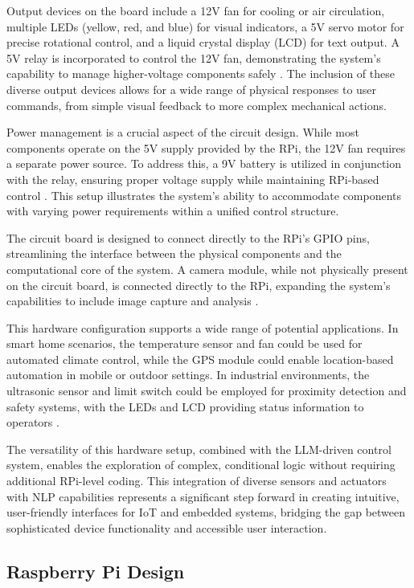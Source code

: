 \documentclass[lettersize,journal]{IEEEtran}
\begin{document}
Output devices on the board include a 12V fan for cooling or air circulation, multiple LEDs (yellow, red, and blue) for visual indicators, a 5V servo motor for precise rotational control, and a liquid crystal display (LCD) for text output. A 5V relay is incorporated to control the 12V fan, demonstrating the system's capability to manage higher-voltage components safely \cite{smith2020}. The inclusion of these diverse output devices allows for a wide range of physical responses to user commands, from simple visual feedback to more complex mechanical actions.

Power management is a crucial aspect of the circuit design. While most components operate on the 5V supply provided by the RPi, the 12V fan requires a separate power source. To address this, a 9V battery is utilized in conjunction with the relay, ensuring proper voltage supply while maintaining RPi-based control \cite{monk2019}. This setup illustrates the system's ability to accommodate components with varying power requirements within a unified control structure.

The circuit board is designed to connect directly to the RPi's GPIO pins, streamlining the interface between the physical components and the computational core of the system. A camera module, while not physically present on the circuit board, is connected directly to the RPi, expanding the system's capabilities to include image capture and analysis \cite{pi_camera_2018}.

This hardware configuration supports a wide range of potential applications. In smart home scenarios, the temperature sensor and fan could be used for automated climate control, while the GPS module could enable location-based automation in mobile or outdoor settings. In industrial environments, the ultrasonic sensor and limit switch could be employed for proximity detection and safety systems, with the LEDs and LCD providing status information to operators \cite{mcmanus2021}.

The versatility of this hardware setup, combined with the LLM-driven control system, enables the exploration of complex, conditional logic without requiring additional RPi-level coding. This integration of diverse sensors and actuators with NLP capabilities represents a significant step forward in creating intuitive, user-friendly interfaces for IoT and embedded systems, bridging the gap between sophisticated device functionality and accessible user interaction.

\subsection{Raspberry Pi Design}
\end{document}
